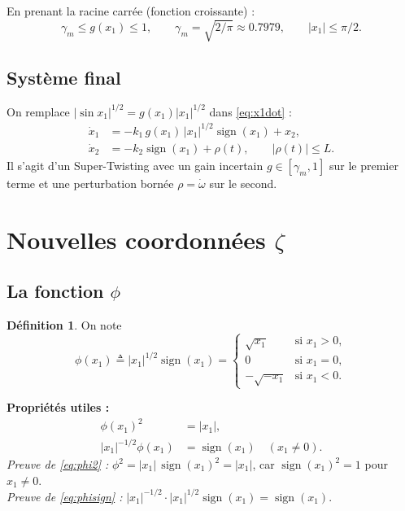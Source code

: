 \documentclass[11pt,a4paper]{article}
\numberwithin{equation}{section}
\theoremstyle{plain}
\theoremstyle{definition}
\newtheorem{definition}[theoreme]{Définition}
\theoremstyle{remark}
\newcommand{\sign}{\operatorname{sign}}
\begin{document}
En prenant la racine carrée (fonction croissante) :
\begin{equation}\label{eq:gm}
\boxed{\gamma_m \le g(x_1)\le 1,\qquad \gamma_m = \sqrt{2/\pi}\approx 0.7979,\qquad |x_1|\le\pi/2 .}
\end{equation}

\subsection{Système final}
On remplace $|\sin x_1|^{1/2}=g(x_1)|x_1|^{1/2}$ dans \eqref{eq:x1dot} :
\begin{equation}\label{eq:bf}
\boxed{
\begin{aligned}
\dot x_1 &= -k_1\,g(x_1)\,|x_1|^{1/2}\sign(x_1) + x_2,\\
\dot x_2 &= -k_2\sign(x_1) + \rho(t),\qquad |\rho(t)|\le L .
\end{aligned}}
\end{equation}
Il s'agit d'un Super-Twisting avec un gain incertain $g\in[\gamma_m,1]$ sur le premier terme
et une perturbation bornée $\rho=\dot\omega$ sur le second.

\section{Nouvelles coordonnées $\zeta$}

\subsection{La fonction $\phi$}
\begin{definition}
On note
\begin{equation}
\phi(x_1) \triangleq |x_1|^{1/2}\sign(x_1) =
\begin{cases} \sqrt{x_1} & \text{si } x_1>0,\\ 0 & \text{si } x_1=0,\\ -\sqrt{-x_1} & \text{si } x_1<0.\end{cases}
\end{equation}
\end{definition}

\textbf{Propriétés utiles :}
\begin{align}
\phi(x_1)^2 &= |x_1|, \label{eq:phi2}\\
|x_1|^{-1/2}\phi(x_1) &= \sign(x_1)\quad (x_1\neq0). \label{eq:phisign}
\end{align}
\emph{Preuve de \eqref{eq:phi2} :} $\phi^2 = |x_1|\,\sign(x_1)^2 = |x_1|$, car $\sign(x_1)^2=1$ pour $x_1\neq 0$.\\
\emph{Preuve de \eqref{eq:phisign} :} $|x_1|^{-1/2}\cdot|x_1|^{1/2}\sign(x_1) = \sign(x_1)$.
\end{document}
